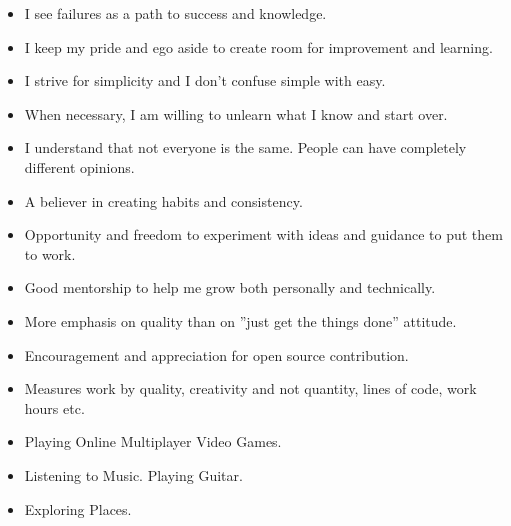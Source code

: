 



\smallskip
\begin{itemize}
\item I see failures as a path to success and knowledge.
\item I keep my pride and ego aside to create room for improvement and learning.
\item I strive for simplicity and I don’t confuse simple with easy.
\item When necessary, I am willing to unlearn what I know and start over.
\item I understand that not everyone is the same. People can have completely different opinions.
\item A believer in creating habits and consistency.
\end{itemize}

\smallskip
\begin{itemize}
\item Opportunity and freedom to experiment with ideas and guidance to put them to work.
\item Good mentorship to help me grow both personally and technically.
\item More emphasis on quality than on ”just get the things done” attitude.
\item Encouragement and appreciation for open source contribution.
\item Measures work by quality, creativity and not quantity, lines of code, work hours etc.
\end{itemize}

\smallskip
\begin{itemize}
\item Playing Online Multiplayer Video Games.
\smallskip
\item Listening to Music. Playing Guitar.
\smallskip
\item Exploring Places.
\end{itemize}